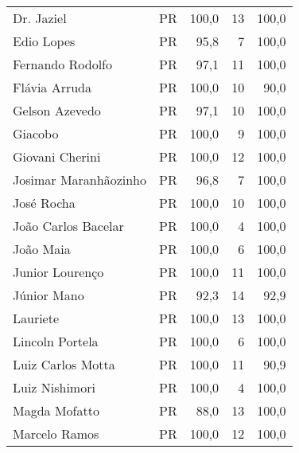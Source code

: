\begin{longtable}{llrrr}
                          Dr. Jaziel &             PR &     100,0 &           13 &      100,0 \\
                          Edio Lopes &             PR &      95,8 &            7 &      100,0 \\
                    Fernando Rodolfo &             PR &      97,1 &           11 &      100,0 \\
                       Flávia Arruda &             PR &     100,0 &           10 &       90,0 \\
                      Gelson Azevedo &             PR &      97,1 &           10 &      100,0 \\
                             Giacobo &             PR &     100,0 &            9 &      100,0 \\
                     Giovani Cherini &             PR &     100,0 &           12 &      100,0 \\
               Josimar Maranhãozinho &             PR &      96,8 &            7 &      100,0 \\
                          José Rocha &             PR &     100,0 &           10 &      100,0 \\
                 João Carlos Bacelar &             PR &     100,0 &            4 &      100,0 \\
                           João Maia &             PR &     100,0 &            6 &      100,0 \\
                     Junior Lourenço &             PR &     100,0 &           11 &      100,0 \\
                         Júnior Mano &             PR &      92,3 &           14 &       92,9 \\
                            Lauriete &             PR &     100,0 &           13 &      100,0 \\
                     Lincoln Portela &             PR &     100,0 &            6 &      100,0 \\
                   Luiz Carlos Motta &             PR &     100,0 &           11 &       90,9 \\
                      Luiz Nishimori &             PR &     100,0 &            4 &      100,0 \\
                       Magda Mofatto &             PR &      88,0 &           13 &      100,0 \\
                       Marcelo Ramos &             PR &     100,0 &           12 &      100,0 \\

\end{longtable}
